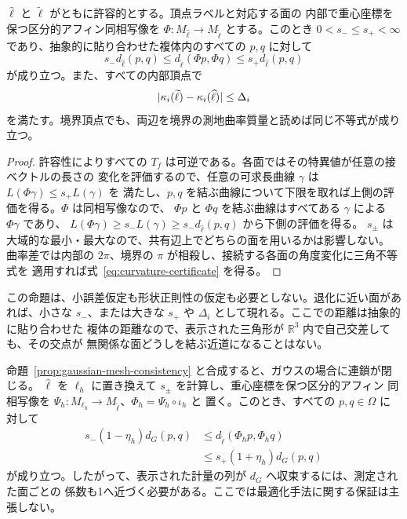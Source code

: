 \begin{proposition}[固定した実現の事後歪み]
\label{prop:pl-certificate}
$\widehat\ell$ と $\widetilde\ell$ がともに許容的とする。頂点ラベルと対応する面の
内部で重心座標を保つ区分的アフィン同相写像を
$\Phi:M_{\widehat\ell}\to M_{\widetilde\ell}$ とする。このとき
$0<s_-\le s_+<\infty$ であり、抽象的に貼り合わせた複体内のすべての $p,q$ に対して
\begin{equation}
 s_-d_{\widehat\ell}(p,q)
 \le d_{\widetilde\ell}(\Phi p,\Phi q)
 \le s_+d_{\widehat\ell}(p,q)
 \label{eq:distance-certificate}
\end{equation}
が成り立つ。また、すべての内部頂点で
\begin{equation}
 \lvert \kappa_i(\widetilde\ell)-\kappa_i(\widehat\ell)\rvert
 \le \Delta_i
 \label{eq:curvature-certificate}
\end{equation}
を満たす。境界頂点でも、両辺を境界の測地曲率質量と読めば同じ不等式が成り立つ。
\end{proposition}

\begin{proof}
許容性によりすべての $T_f$ は可逆である。各面ではその特異値が任意の接ベクトルの長さの
変化を評価するので、任意の可求長曲線 $\gamma$ は $L(\Phi\gamma)\le s_+L(\gamma)$ を
満たし、$p,q$ を結ぶ曲線について下限を取れば上側の評価を得る。$\Phi$ は同相写像なので、
$\Phi p$ と $\Phi q$ を結ぶ曲線はすべてある $\gamma$ による $\Phi\gamma$ であり、
$L(\Phi\gamma)\ge s_-L(\gamma)\ge s_-d_{\widehat\ell}(p,q)$ から下側の評価を得る。
$s_\pm$ は大域的な最小・最大なので、共有辺上でどちらの面を用いるかは影響しない。
曲率差では内部の $2\pi$、境界の $\pi$ が相殺し、接続する各面の角度変化に三角不等式を
適用すれば式~\eqref{eq:curvature-certificate} を得る。
\end{proof}

この命題は、小誤差仮定も形状正則性の仮定も必要としない。退化に近い面があれば、小さな
$s_-$、または大きな $s_+$ や $\Delta_i$ として現れる。ここでの距離は抽象的に貼り合わせた
複体の距離なので、表示された三角形が $\mathbb R^3$ 内で自己交差しても、その交点が
無関係な面どうしを結ぶ近道になることはない。

命題~\ref{prop:gaussian-mesh-consistency} と合成すると、ガウスの場合に連鎖が閉じる。
$\widehat\ell$ を $\ell_h$ に置き換えて $s_\pm$ を計算し、重心座標を保つ区分的アフィン
同相写像を $\Psi_h:M_{\ell_h}\to M_{\widetilde\ell}$、$\Phi_h=\Psi_h\circ\iota_h$ と
置く。このとき、すべての $p,q\in\Omega$ に対して
\begin{equation}
 \begin{aligned}
 s_-(1-\eta_h)d_G(p,q)
 &\le d_{\widetilde\ell}(\Phi_hp,\Phi_hq)\\
 &\le s_+(1+\eta_h)d_G(p,q)
 \end{aligned}
 \label{eq:end-to-end-gaussian-display}
\end{equation}
が成り立つ。したがって、表示された計量の列が $d_G$ へ収束するには、測定された面ごとの
係数も1へ近づく必要がある。ここでは最適化手法に関する保証は主張しない。

